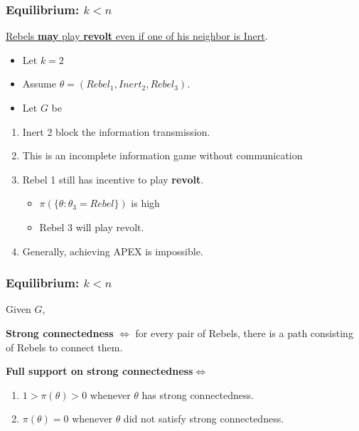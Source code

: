 \documentclass[10pt]{beamer}
\begin{document}
\begin{frame}
  \frametitle{Equilibrium: $k<n$}

\underline{Rebels \textbf{may} play \textbf{revolt} even if one of his neighbor is Inert}. 
\begin{itemize}
\item Let $k=2$
\item Assume $\theta=(Rebel_1,Inert_2,Rebel_3)$.
\item Let $G$ be
\begin{center}
\end{center}
\end{itemize}
 
\begin{enumerate}

\item Inert 2 block the information transmission.
\item This is an incomplete information game without communication

\item Rebel 1 still has incentive to play \textbf{revolt}. 
\begin{itemize}
\item $\pi(\{\theta:\theta_3=Rebel\})$ is high
\item Rebel 3 will play revolt.
\end{itemize}
\item Generally, achieving APEX is impossible.
\end{enumerate}



\end{frame}

\begin{frame}
  \frametitle{Equilibrium: $k<n$}

Given $G$,
\begin{definition}
\textbf{Strong connectedness} $\Leftrightarrow$ for every pair of Rebels, there is a path consisting of Rebels to connect them.
\end{definition}  

\begin{definition}
\textbf{Full support on strong connectedness}$\Leftrightarrow$ 
\begin{enumerate}
\item $1>\pi(\theta)>0$ whenever $\theta$ has strong connectedness.
\item $\pi(\theta)=0$ whenever $\theta$ did not satisfy strong connectedness.
\end{enumerate}

\end{definition}  

\end{frame}
\end{document}
